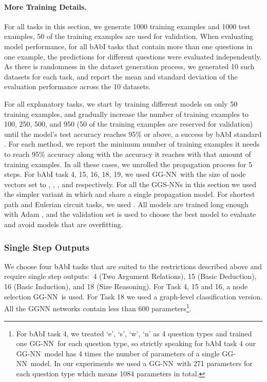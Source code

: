 \documentclass{article} \usepackage{iclr2016_conference,times}
\newcommand{\OurMethodMinorShort}{GG-NN}
\begin{document}
\paragraph{More Training Details. }
For all tasks in this section, we generate 1000 training examples and 1000 test examples,
50 of the training examples are used for validation.
When evaluating model performance, for all bAbI tasks that contain more than
one questions in one example, the predictions for different questions were
evaluated independently.  As there is randomness
in the dataset generation process, we generated 10 such datasets for each
task, and report the mean and standard deviation of the evaluation
performance across the 10 datasets.

For all explanatory tasks, we start by training different models on only 50
training examples, and gradually increase the number of training examples to
100, 250, 500, and 950 (50 of the training examples are reserved for
validation) until the model's test accuracy reaches 95\% or above, a success by
bAbI standard \cite{weston2015towards}. For each method, we report the minimum number of
training examples it needs to reach 95\% accuracy along with the accuracy it
reaches with that amount of training examples.
In all these cases, we unrolled the propagation process for 5 steps.
For bAbI task 4, 15, 16, 18, 19, we used \OurMethodMinorShort~with the size of node
vectors  set to , , ,  and  respectively.
For all the GGS-NNs in this section we used the simpler variant in which
 and  share a single propagation model. For shortest path and Eulerian circuit tasks, we used .
All models are trained long enough with Adam \citep{kingma2014adam}, and the validation set is used to choose
the best model to evaluate and avoid models that are overfitting.



\subsubsection{Single Step Outputs}
We choose four bAbI tasks that are suited to the restrictions
described above and require single step outputs:~4 (Two Argument Relations), 
15 (Basic Deduction), 16 (Basic Induction), and 18 (Size Reasoning).
For Task 4, 15 and 16, a node selection \OurMethodMinorShort~is used. For Task 18
we used a graph-level classification version. All the GGNN networks
contain less than 600 parameters\footnote{For bAbI task 4, we treated `e',
`s', `w', `n' as 4 question types and trained one \OurMethodMinorShort~for
each question type, so strictly speaking for bAbI task 4 our
\OurMethodMinorShort~model has 4
times the number of parameters of a single \OurMethodMinorShort~model.  In our experiments we
used a \OurMethodMinorShort~with 271 parameters for each question type which means 1084
parameters in total.}.
\end{document}
